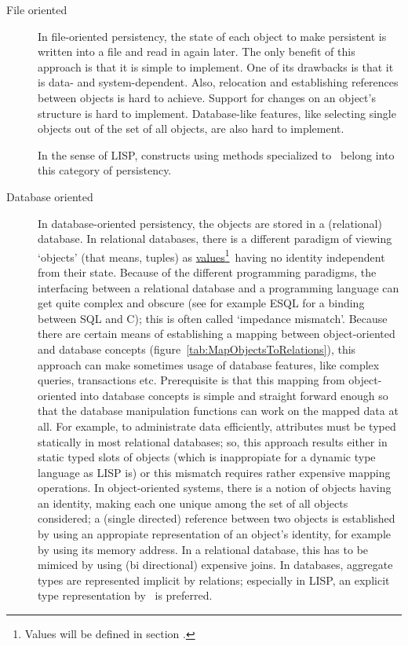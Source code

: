 \begin{description}

\item[File oriented] In file-oriented persistency, the state of each object to make persistent is written into
  a file and read in again later. The only benefit of this approach is
  that it is simple to implement. One of its drawbacks is that it is
  data- and system-dependent.  Also, relocation and establishing
  references between objects is hard to achieve. Support for changes
  on an object's structure is hard to implement. Database-like
  features, like selecting single objects out of the set of all
  objects, are also hard to implement.

  In the sense of LISP, constructs using methods specialized to
  \ belong into this category of persistency.

\item[Database oriented] In database-oriented persistency,
  the objects are stored
  in a (relational) database. In relational databases, there is a
  different paradigm of viewing `objects' (that means, tuples) as
  \hyperlink{link:Value}{values}\footnote{Values will be defined in
    section .}\ having no identity
  independent from their state.  Because of the different programming
  paradigms, the interfacing between a relational database and a
  programming language can get quite complex and obscure (see for
  example ESQL for a binding between SQL and C); this is often called
  `impedance mismatch'.  Because there are certain means of
  establishing a mapping between object-oriented and database concepts
  (figure~\ref{tab:MapObjectsToRelations}), this approach can make
  sometimes usage of database features, like complex queries,
  transactions etc. Prerequisite is that this mapping from
  object-oriented into database concepts is simple and straight
  forward enough so that the database manipulation functions can work
  on the mapped data at all. For example, to administrate data
  efficiently, attributes must be typed statically in most relational
  databases; so, this approach results either in static typed slots of
  objects (which is inappropiate for a dynamic type language as LISP
  is) or this mismatch requires rather expensive mapping operations.
  In object-oriented systems, there is a notion of objects having an
  identity, making each one unique among the set of all objects
  considered; a (single directed) reference between two objects is
  established by using an appropiate representation of an object's
  identity, for example by using its memory address.  In a relational
  database, this has to be mimiced by using (bi directional) expensive
  joins. In databases, aggregate types are represented implicit by
  relations; especially in LISP, an explicit type representation by
  \clsmo[s]\ is preferred.


\end{description}
